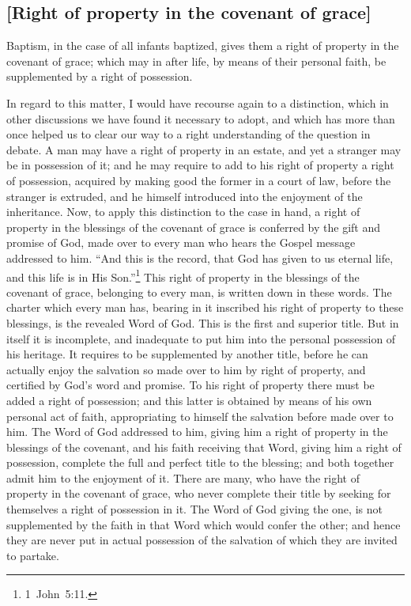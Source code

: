 \documentclass[
]{book}
\begin{document}
\hypertarget{right-of-property-in-the-covenant-of-grace}{%
\subsection{{[}Right of property in the covenant of grace{]}}\label{right-of-property-in-the-covenant-of-grace}}

Baptism, in the case of all infants baptized, gives them a right of property in the covenant of grace; which may in after life, by means of their personal faith, be supplemented by a right of possession.

In regard to this matter, I would have recourse again to a distinction, which in other discussions we have found it necessary to adopt, and which has more than once helped us to clear our way to a right understanding of the question in debate. A man may have a right of property in an estate, and yet a stranger may be in possession of it; and he may require to add to his right of property a right of possession, acquired by making good the former in a court of law, before the stranger is extruded, and he himself introduced into the enjoyment of the inheritance. Now, to apply this distinction to the case in hand, a right of property in the blessings of the covenant of grace is conferred by the gift and promise of God, made over to every man who hears the Gospel message addressed to him. ``And this is the record, that God has given to us eternal life, and this life is in His Son.''\footnote{1~John~5:11.} This right of property in the blessings of the covenant of grace, belonging to every man, is written down in these words. The charter which every man has, bearing in it inscribed his right of property to these blessings, is the revealed Word of God. This is the first and superior title. But in itself it is incomplete, and inadequate to put him into the personal possession of his heritage. It requires to be supplemented by another title, before he can actually enjoy the salvation so made over to him by right of property, and certified by God's word and promise. To his right of property there must be added a right of possession; and this latter is obtained by means of his own personal act of faith, appropriating to himself the salvation before made over to him. The Word of God addressed to him, giving him a right of property in the blessings of the covenant, and his faith receiving that Word, giving him a right of possession, complete the full and perfect title to the blessing; and both together admit him to the enjoyment of it. There are many, who have the right of property in the covenant of grace, who never complete their title by seeking for themselves a right of possession in it. The Word of God giving the one, is not supplemented by the faith in that Word which would confer the other; and hence they are never put in actual possession of the salvation of which they are invited to partake.
\end{document}
